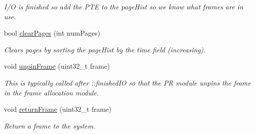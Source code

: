 \begin{DoxyCompactItemize}
\begin{DoxyCompactList}\small\item\em \-I/\-O is finished so add the \-P\-T\-E to the page\-Hist so we know what frames are in use. \end{DoxyCompactList}\item 
bool \hyperlink{classcPRLruApprox_a7b1d7330af067ad28c089fb7a6267c00}{clear\-Pages} (int num\-Pages)
\begin{DoxyCompactList}\small\item\em \-Clears pages by sorting the page\-Hist by the time field (increasing). \end{DoxyCompactList}\item 
\hypertarget{classcPRLruApprox_aa14da3923094c008b82a07f430d97c19}{void \hyperlink{classcPRLruApprox_aa14da3923094c008b82a07f430d97c19}{unpin\-Frame} (uint32\-\_\-t frame)}\label{d1/d58/classcPRLruApprox_aa14da3923094c008b82a07f430d97c19}

\begin{DoxyCompactList}\small\item\em \-This is typically called after \-::finished\-I\-O so that the \-P\-R module unpins the frame in the frame allocation module. \end{DoxyCompactList}\item 
void \hyperlink{classcPRLruApprox_a5cc1b3cbc08b1ef334eb37138ff95c43}{return\-Frame} (uint32\-\_\-t frame)
\begin{DoxyCompactList}\small\item\em \-Return a frame to the system. \end{DoxyCompactList}\end{DoxyCompactItemize}
